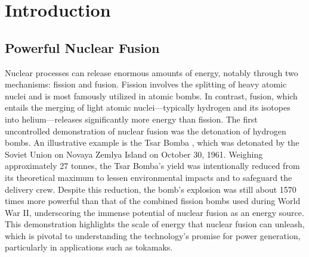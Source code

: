 
\chapter{Introduction}  %

\ifpdf
    \graphicspath{{Chapter1/Figs/Raster/}{Chapter1/Figs/PDF/}{Chapter1/Figs/}}
\else
    \graphicspath{{Chapter1/Figs/Vector/}{Chapter1/Figs/}}
\fi

\label{chapter 1}


\section{Powerful Nuclear Fusion}
\label{section1.1}
 Nuclear processes can release enormous amounts of energy, notably through two mechanisms: fission and fusion. Fission involves the splitting of heavy atomic nuclei and is most famously utilized in atomic bombs. In contrast, fusion, which entails the merging of light atomic nuclei—typically hydrogen and its isotopes into helium—releases significantly more energy than fission. The first uncontrolled demonstration of nuclear fusion was the detonation of hydrogen bombs. An illustrative example is the Tsar Bomba  \cite{TsarBomba}, which was detonated by the Soviet Union on Novaya Zemlya Island on October 30, 1961. Weighing approximately 27 tonnes, the Tsar Bomba's yield was intentionally reduced from its theoretical maximum to lessen environmental impacts and to safeguard the delivery crew. Despite this reduction, the bomb's explosion was still about 1570 times more powerful than that of the combined fission bombs used during World War II, underscoring the immense potential of nuclear fusion as an energy source. This demonstration highlights the scale of energy that nuclear fusion can unleash, which is pivotal to understanding the technology's promise for power generation, particularly in applications such as tokamaks.

